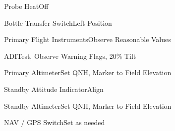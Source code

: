 \documentclass[sim-use]{checklist}
\begin{document}
\begin{continuedchecklist}
    \item{Probe Heat}{Off}
    \item{Bottle Transfer Switch}{Left Position}
     {
        \item {Primary Flight Instruments}{Observe Reasonable Values}
        \item{ADI}{Test, Observe Warning Flags, 20\% Tilt}
        \item{Primary Altimeter}{Set QNH, Marker to Field Elevation}
        \item{Standby Attitude Indicator}{Align}
        \item {Standby Altimeter}{Set QNH, Marker to Field Elevation}
        \item {NAV / GPS Switch}{Set as needed}
    }
    

\end{continuedchecklist}
\end{document}
